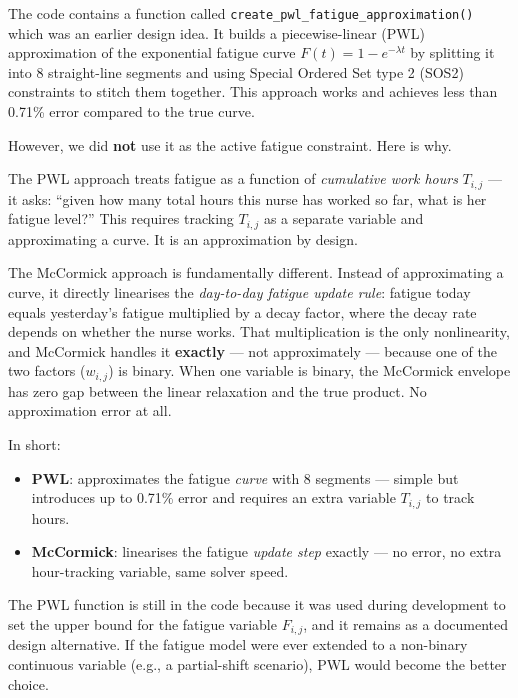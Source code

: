 \documentclass[12pt,a4paper]{article}
\begin{document}
\begin{contribbox}
The code contains a function called \texttt{create\_pwl\_fatigue\_approximation()} which was an earlier design idea. It builds a piecewise-linear (PWL) approximation of the exponential fatigue curve $F(t)=1-e^{-\lambda t}$ by splitting it into 8 straight-line segments and using Special Ordered Set type 2 (SOS2) constraints to stitch them together. This approach works and achieves less than 0.71\% error compared to the true curve.

However, we did \textbf{not} use it as the active fatigue constraint. Here is why.

The PWL approach treats fatigue as a function of \emph{cumulative work hours} $T_{i,j}$ --- it asks: ``given how many total hours this nurse has worked so far, what is her fatigue level?'' This requires tracking $T_{i,j}$ as a separate variable and approximating a curve. It is an approximation by design.

The McCormick approach is fundamentally different. Instead of approximating a curve, it directly linearises the \emph{day-to-day fatigue update rule}: fatigue today equals yesterday's fatigue multiplied by a decay factor, where the decay rate depends on whether the nurse works. That multiplication is the only nonlinearity, and McCormick handles it \textbf{exactly} --- not approximately --- because one of the two factors ($w_{i,j}$) is binary. When one variable is binary, the McCormick envelope has zero gap between the linear relaxation and the true product. No approximation error at all.

In short:
\begin{itemize}[itemsep=3pt]
  \item \textbf{PWL}: approximates the fatigue \emph{curve} with 8 segments --- simple but introduces up to 0.71\% error and requires an extra variable $T_{i,j}$ to track hours.
  \item \textbf{McCormick}: linearises the fatigue \emph{update step} exactly --- no error, no extra hour-tracking variable, same solver speed.
\end{itemize}

The PWL function is still in the code because it was used during development to set the upper bound for the fatigue variable $F_{i,j}$, and it remains as a documented design alternative. If the fatigue model were ever extended to a non-binary continuous variable (e.g., a partial-shift scenario), PWL would become the better choice.
\end{contribbox}
\end{document}
